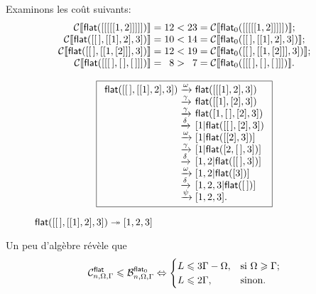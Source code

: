 Examinons les coût suivants:
\begin{equation*}
\begin{array}{@{}r@{\;}c@{\;}r@{\;}c@{\;}r@{\;}c@{\;}l@{}}
\Call{\fun{flat}([[[[[1,2]]]]])}
  &=& 12 &<& 23 &=& \Call{\fun{flat\(_0\)}([[[[[1,2]]]]])};\\
\Call{\fun{flat}([\el,[[1],2],3])}
  &=& 10 &<& 14 &=& \Call{\fun{flat\(_0\)}([\el,[[1],2],3])};\\
\Call{\fun{flat}([\el,[[1,[2]]],3])}
  &=& 12 &<& 19 &=& \Call{\fun{flat\(_0\)}([\el,[[1,[2]]],3])};\\
\Call{\fun{flat}([[\el,\el,\el]])}
  &=&  8 &>&  7 &=& \Call{\fun{flat\(_0\)}([[\el,\el,\el]])}.
\end{array}
\end{equation*}
\begin{figure}
\begin{equation*}
\boxed{%
\begin{array}{r@{\;}l@{\;}l}
\fun{flat}([\el,[[1],2],3])
& \xrightarrow{\smash{\omega}} & \fun{flat}([[[1],2],3])\\
& \xrightarrow{\smash{\gamma}} & \fun{flat}([[1],[2],3])\\
& \xrightarrow{\smash{\gamma}} & \fun{flat}([1,\el,[2],3])\\
& \xrightarrow{\smash{\delta}} & [1|\fun{flat}([\el,[2],3])\\
& \xrightarrow{\smash{\omega}} & [1|\fun{flat}([[2],3])]\\
& \xrightarrow{\smash{\gamma}} & [1|\fun{flat}([2,\el,3])]\\
& \xrightarrow{\smash{\delta}} & [1,2|\fun{flat}([\el,3])]\\
& \xrightarrow{\smash{\omega}} & [1,2|\fun{flat}([3])]\\
& \xrightarrow{\smash{\delta}} & [1,2,3|\fun{flat}(\el)]\\
& \xrightarrow{\smash{\psi}}   & [1,2,3].
\end{array}}
\end{equation*}
\caption{\(\fun{flat}([\el,[[1],2],3]) \twoheadrightarrow [1,2,3]\)}
\label{fig:flat_ex}
\end{figure}
Un peu d'algèbre révèle que
\begin{equation*}
\C{\fun{flat}}{n,\Omega,\Gamma}
\leqslant
\B{\fun{flat}_0}{n,\Omega,\Gamma}
\Leftrightarrow
\begin{cases}
  L \leqslant 3\Gamma - \Omega,
                         & \text{si \(\Omega \geqslant \Gamma\)};\\
  L \leqslant 2\Gamma,   & \text{sinon.}
\end{cases}
\end{equation*}
